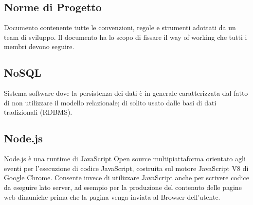 \documentclass[../glossario.tex]{subfiles}
\begin{document}
\subsection*{Norme di Progetto}
Documento contenente tutte le convenzioni, regole e strumenti adottati da un team di sviluppo. Il documento ha lo scopo di fissare il way of working che tutti i membri devono seguire.

\subsection*{NoSQL}
Sistema software dove la persistenza dei dati è in generale caratterizzata dal fatto di non utilizzare il modello relazionale; di solito usato dalle basi di dati tradizionali (RDBMS).

\subsection*{Node.js}
Node.js è una runtime di JavaScript Open source multipiattaforma orientato agli eventi per l'esecuzione di codice JavaScript, costruita sul motore JavaScript V8 di Google Chrome. Consente invece di utilizzare JavaScript anche per scrivere codice da eseguire lato server, ad esempio per la produzione del contenuto delle pagine web dinamiche prima che la pagina venga inviata al Browser dell'utente.


    
\end{document}
